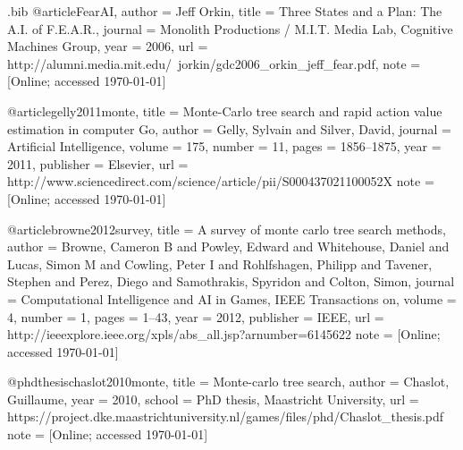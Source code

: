 \begin{filecontents*}{\jobname.bib}
@article{FearAI,
	author	= {Jeff Orkin},
	title		= {Three {S}tates and a {P}lan: The {A}.{I}. of {F.E.A.R.}},
	journal	= {Monolith Productions / M.I.T. Media Lab, Cognitive Machines Group},
	year		= {2006},
	url 		= {http://alumni.media.mit.edu/~jorkin/gdc2006\_orkin\_jeff\_fear.pdf},
	note		= {[Online; accessed \today]}
}

@article{gelly2011monte,
	title		= {{M}onte-{C}arlo tree search and rapid action value estimation in computer {G}o},
	author	= {Gelly, Sylvain and Silver, David},
	journal	= {Artificial Intelligence},
	volume	= {175},
	number	= {11},
	pages		= {1856--1875},
	year		= {2011},
	publisher	= {Elsevier},
	url 		= {http://www.sciencedirect.com/science/article/pii/S000437021100052X}
	note		= {[Online; accessed \today]}
}

@article{browne2012survey,
	title 		= {{A} survey of monte carlo tree search methods},
	author 	= {Browne, Cameron B and Powley, Edward and Whitehouse, Daniel and Lucas, Simon M and Cowling, Peter I and Rohlfshagen, Philipp and Tavener, Stephen and Perez, Diego and Samothrakis, Spyridon and Colton, Simon},
	journal 	= {Computational Intelligence and AI in Games, IEEE Transactions on},
	volume 	= {4},
	number 	= {1},
	pages 	= {1--43},
	year 		= {2012},
	publisher 	= {IEEE},
	url 		= {http://ieeexplore.ieee.org/xpls/abs\_all.jsp?arnumber=6145622}
	note		= {[Online; accessed \today]}
}

@phdthesis{chaslot2010monte,
	title		= {Monte-carlo tree search},
	author	= {Chaslot, Guillaume},
	year		= {2010},
	school		= {PhD thesis, Maastricht University},
	url 		= {https://project.dke.maastrichtuniversity.nl/games/files/phd/Chaslot\_thesis.pdf}
	note		= {[Online; accessed \today]}
}

\end{filecontents*}


\nocite{*}
